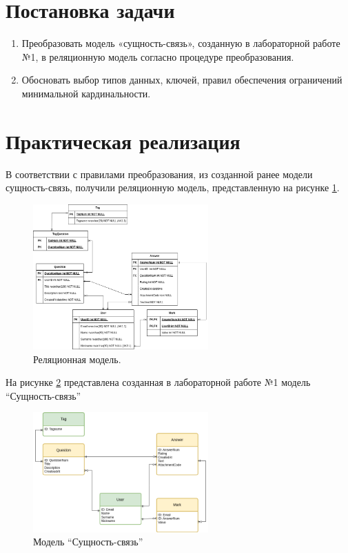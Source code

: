 \documentclass[a4paper, 14pt]{extarticle}
\begin{document}
\newpage




\section{Постановка задачи}

\begin{enumerate}
	\item{Преобразовать модель «сущность-связь», созданную в лабораторной работе №1, в реляционную модель согласно процедуре преобразования.} 
	\item{Обосновать выбор типов данных, ключей, правил обеспечения ограничений минимальной кардинальности.}
\end{enumerate}

\newpage

\section{Практическая реализация}

В соответствии с правилами преобразования, из созданной ранее модели сущность-связь, получили реляционную модель, представленную на  рисунке \ref{fig:relation_model}.

\begin{figure}[ht]
\centering
\includegraphics[width=0.6\textwidth]{Diagram2}
\caption{Реляционная модель.} 
\label{fig:relation_model}
\end{figure}

На рисунке \ref{fig:er_model} представлена созданная в лабораторной работе №1 модель “Сущность-связь”

\begin{figure}[ht]
\centering
\includegraphics[width=0.6\textwidth]{Diagram1} %
\caption{Модель “Сущность-связь”} %
\label{fig:er_model}
\end{figure}
\end{document}
